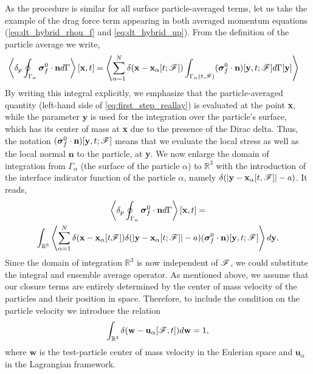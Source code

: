 As the procedure is similar for all surface particle-averaged terms, let us take the example of the drag force term appearing in both averaged momentum equations (\ref{eq:dt_hybrid_rhou_f} and \ref{eq:dt_hybrid_up}). 
From the definition of the particle average we write,
\begin{align}
    \pSavg{\bm\sigma_f^0\cdot\textbf{n}}[\textbf{x},t]
    &= \avg{ \sum_{\alpha=1}^N \delta(\textbf{x}-\textbf{x}_\alpha[t; \FF])
    \int_{\Gamma_\alpha(t,\FF)}
    (\bm\sigma_f^0\cdot\textbf{n})[\textbf{y},t;\FF]
    d\Gamma[\textbf{y}] }
    \label{eq:first_step_reallay}
\end{align}
By writing this integral explicitly, we emphasize that the particle-averaged quantity (left-hand side of \ref{eq:first_step_reallay}) is evaluated at the point \textbf{x}, while the parameter $\textbf{y}$ is used for the integration over the particle's surface, which has its center of mass at \textbf{x} due to the presence of the Dirac delta. 
Thus, the notation $(\bm\sigma_f^0\cdot\textbf{n})[\textbf{y},t;\mathscr{F}]$ means that we evaluate the local stress as well as the local normal $\textbf{n}$ to the particle, at \textbf{y}. 
We now enlarge the domain of integration from $\Gamma_\alpha$ (the surface of the particle $\alpha$) to $\mathbb{R}^3$ with the introduction of the interface indicator function of the particle $\alpha$, namely $\delta(|\textbf{y} - \textbf{x}_\alpha[t,\mathscr{F}]| - a)$. 
It reads,
\begin{multline}
    \pSavg{\bm\sigma_f^0\cdot\textbf{n}}[\textbf{x},t]
    = \\
    \int_{\mathbb{R}^3}
    \avg{
     \sum_{\alpha=1}^N 
     \delta(\textbf{x}-\textbf{x}_\alpha[t \FF])
    \delta(|\textbf{y} - \textbf{x}_{\alpha}[t;\FF]|-a)
    (\bm\sigma_f^0\cdot\textbf{n})[\textbf{y},t;\FF]
    }
    d\textbf{y}. 
    \label{eq:first_step_drag}
\end{multline} 
Since the domain of integration $\mathbb{R}^3$ is now independent of $\mathscr{F}$, we could substitute the integral and ensemble average operator. 
As mentioned above, we assume that our closure terms are entirely determined by the center of mass velocity of the particles and their position in space. 
Therefore, to include the condition on the particle velocity we introduce the relation 
\begin{equation}
    \int_{\mathbb{R}^3} \delta(\textbf{w} - \textbf{u}_\alpha[\FF,t]) d\textbf{w} = 1,
    \label{eq:Pw_normed}
\end{equation}
where $\textbf{w}$ is the test-particle center of mass velocity in the Eulerian space and $\textbf{u}_\alpha$ in the Lagrangian framework. 

